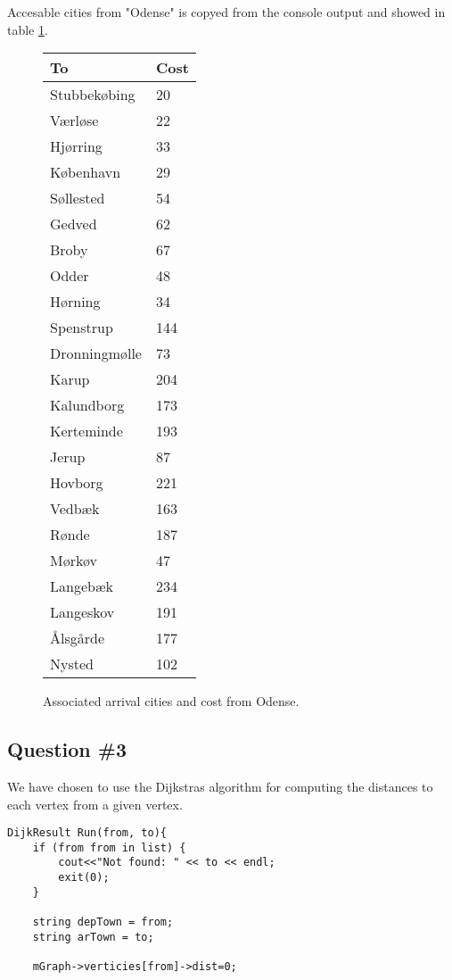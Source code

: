 \begin{lslisting}
Accesable cities from "Odense" is copyed from the console output and showed in table \ref{tb:fromodense}. 
\begin{figure}[th!]
\centering
\begin{tabular}{l|l}
To &Cost\\\hline
Stubbekøbing & 20\\
Værløse & 22\\
Hjørring & 33\\
København & 29\\
Søllested & 54\\
Gedved & 62\\
Broby & 67\\
Odder & 48\\
Hørning & 34\\
Spenstrup & 144\\
Dronningmølle & 73\\
Karup & 204\\
Kalundborg & 173\\
Kerteminde & 193\\
Jerup & 87\\
Hovborg & 221\\
Vedbæk & 163\\
Rønde & 187\\
Mørkøv & 47\\
Langebæk & 234\\
Langeskov & 191\\
Ålsgårde & 177\\
Nysted & 102\\
\end{tabular}
\captionsetup{type=table}
\caption[tekst i indholdsfortegnelsen]{Associated arrival cities and cost from Odense.}
\label{tb:fromodense}
\end{figure}

\subsection{Question \#3}
We have chosen to use the Dijkstras algorithm for computing the distances to each vertex from a given vertex. \\

\begin{lstlisting}
DijkResult Run(from, to){
	if (from from in list) {
		cout<<"Not found: " << to << endl;
		exit(0);
	}

	string depTown = from;
	string arTown = to;

	mGraph->verticies[from]->dist=0;


\end{lstlisting}
\end{lslisting}
